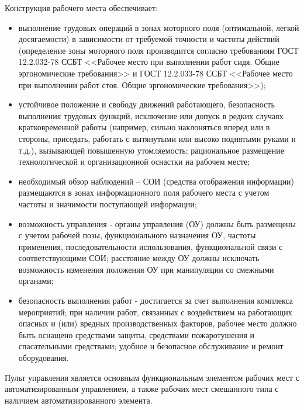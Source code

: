         Конструкция рабочего места обеспечивает:
        \begin{itemize}
            \item выполнение трудовых операций в зонах моторного поля
                (оптимальной, легкой досягаемости) в зависимости от требуемой
                точности и частоты действий (определение зоны моторного поля
                производится согласно требованиям ГОСТ 12.2.032-78 ССБТ
                <<Рабочее место при выполнении работ сидя. Общие эргономические
                требования>> и ГОСТ 12.2.033-78 ССБТ <<Рабочее место при
                выполнении работ стоя.  Общие эргономические требования>>);
            \item устойчивое положение и свободу движений работающего,
                безопасность выполнения трудовых функций, исключение или допуск
                в редких случаях кратковременной работы (например, сильно
                наклоняться вперед или в стороны, приседать, работать с
                вытянутыми или высоко поднятыми руками и т.д.), вызывающей
                повышенную утомляемость; рациональное размещение
                технологической и  организационной оснастки на рабочем месте;
            \item необходимый обзор наблюдений – СОИ (средства отображения
                информации) размещаются в зонах информационного поля рабочего
                места с учетом частоты и значимости поступающей информации;
            \item возможность управления - органы управления (ОУ) должны быть
                размещены с учетом рабочей позы, функционального назначения ОУ,
                частоты применения, последовательности использования,
                функциональной связи с соответствующими СОИ; расстояние между
                ОУ должны исключать возможность изменения положения ОУ при
                манипуляции со смежными органами;
            \item безопасность выполнения работ - достигается за счет
                выполнения комплекса мероприятий; при наличии работ, связанных
                с воздействием на работающих опасных и (или) вредных
                производственных факторов, рабочее место должно быть оснащено
                средствами защиты, средствами пожаротушения и спасательными
                средствами; удобное и безопасное обслуживание и ремонт
                оборудования.
        \end{itemize}

        Пульт управления является основным функциональным элементом рабочих
        мест с автоматизированным управлением, а также рабочих мест смешанного
        типа с наличием автоматизированного элемента.

